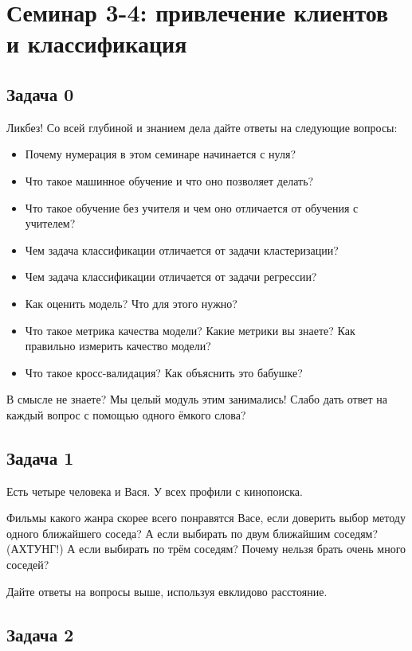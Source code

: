 \documentclass[12pt, a4paper, oneside]{article}
\begin{document}
\section*{Семинар 3-4:  привлечение клиентов и классификация}

\subsection*{Задача 0}

Ликбез!  Со всей глубиной и знанием дела дайте ответы на следующие вопросы: 

\begin{itemize}
\item  Почему нумерация в этом семинаре начинается с нуля? 
\item  Что такое машинное обучение и что оно позволяет делать? 
\item  Что такое обучение без учителя и чем оно отличается от обучения с учителем? 
\item  Чем задача классификации отличается от задачи кластеризации? 
\item  Чем задача классификации отличается от задачи регрессии? 
\item  Как оценить модель? Что для этого нужно? 
\item Что такое метрика качества модели? Какие метрики вы знаете? Как правильно измерить качество модели? 
\item Что такое кросс-валидация?  Как объяснить это бабушке? 
\end{itemize}

В смысле не знаете? Мы целый модуль этим занимались!  Слабо дать ответ на каждый вопрос с помощью одного ёмкого слова? 

\subsection*{Задача 1}

Есть четыре человека и Вася. У всех профили с кинопоиска. 

Фильмы какого жанра скорее всего понравятся Васе, если доверить выбор методу одного ближайшего соседа? 
А если выбирать по двум ближайшим соседям? (АХТУНГ!)
А если выбирать по трём соседям? 
Почему нельзя брать очень много соседей? 

Дайте ответы на вопросы выше, используя евклидово расстояние. 



\subsection*{Задача 2}
\end{document}
